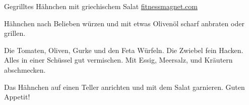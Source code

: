 \begin{recipe}[]{  Gegrilltes Hähnchen mit griechischem Salat  }{ \href{http://www.fitnessmagnet.com/Rezepte/tabid/80/Fitness/View/Fitnessartikel/1829/Gegrilltes-Hahnchen-mit-griechischem-Salat.aspx}{fitnessmagnet.com} }{  }



\step
Hähnchen nach Belieben würzen und mit etwas Olivenöl scharf anbraten oder grillen.

\step
Die Tomaten, Oliven, Gurke und den Feta Würfeln. Die Zwiebel fein Hacken. Alles in einer Schüssel gut vermischen.
Mit Essig, Meersalz, und Kräutern abschmecken.

\step
Das Hähnchen auf einen Teller anrichten und mit dem Salat garnieren. Guten Appetit!



\end{recipe}
